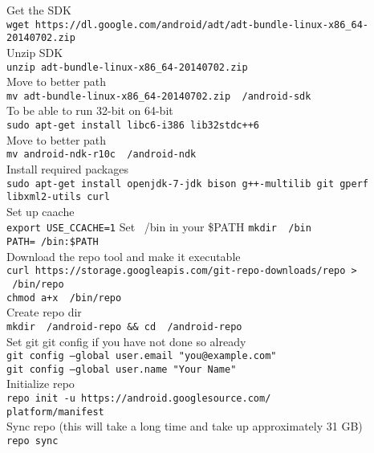   Get the SDK\\
  \texttt{\justify \justify wget https://dl.google.com/android/adt/adt-bundle-linux-x86\_64-20140702.zip} \\
  Unzip SDK\\
  \texttt{\justify unzip adt-bundle-linux-x86\_64-20140702.zip} \\
  Move to better path\\
  \texttt{\justify mv adt-bundle-linux-x86\_64-20140702.zip ~/android-sdk} \\
  To be able to run 32-bit on 64-bit\\
  \texttt{\justify sudo apt-get install libc6-i386 lib32stdc++6} \\
  Move to better path\\
  \texttt{\justify mv android-ndk-r10c ~/android-ndk} \\
  Install required packages\\
  \texttt{\justify sudo apt-get install openjdk-7-jdk bison g++-multilib git gperf libxml2-utils curl} \\
  Set up caache\\
  \texttt{\justify export USE\_CCACHE=1}
  Set ~/bin in your \$PATH
  \texttt{\justify mkdir ~/bin} \\
  \texttt{\justify PATH=~/bin:\$PATH} \\
  Download the repo tool and make it executable\\
  \texttt{\justify curl https://storage.googleapis.com/git-repo-downloads/repo > ~/bin/repo} \\
  \texttt{\justify chmod a+x ~/bin/repo} \\
  Create repo dir\\
  \texttt{\justify mkdir ~/android-repo \&\& cd ~/android-repo} \\
  Set git git config if you have not done so already\\
  \texttt{\justify git config --global user.email "you@example.com"} \\
  \texttt{\justify git config --global user.name "Your Name"} \\
  Initialize repo\\
  \texttt{\justify repo init -u https://android.googlesource.com/\\platform/manifest} \\
  Sync repo (this will take a long time and take up approximately 31 GB)\\
  \texttt{\justify repo sync} \\
